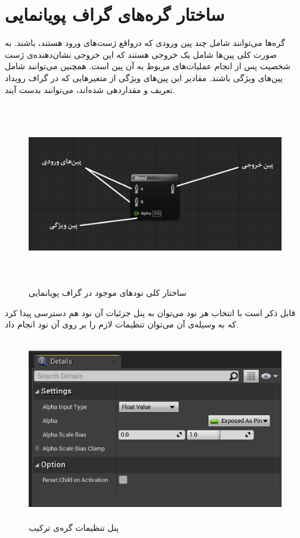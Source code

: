 \section{ساختار گره‌های گراف پویانمایی}

گره‌‌ها می‌توانند شامل چند پین ورودی که درواقع ژست‌های ورود هستند، باشند.
به صورت کلی پین‌ها شامل یک خروجی هستند که این خروجی نشان‌دهنده‌ی 
ژست شخصیت پس از انجام عملیات‌های مربوط به آن پین است.
همچنین می‌توانند شامل پین‌های ویژگی باشند. مقادیر این پین‌های ویژگی از 
متغیر‌هایی که در گراف رویداد تعریف و مقداردهی شده‌اند، می‌توانند بدست آیند.

\begin{figure}[ht]
	\centerline{\includegraphics[width=\textwidth,height=8cm,keepaspectratio]{Figures/Ch3/AnimNodeStructure.png}}

	\caption{ساختار کلی نود‌های موجود در گراف پویانمایی}
	\label{fig:AnimNodeStructure}
\end{figure}

قابل ذکر است با انتخاب هر نود می‌توان به پنل جزئیات آن نود هم دسترسی پیدا کرد 
که به وسیله‌ی آن می‌توان تنظیمات لازم را بر روی آن نود انجام داد.

\begin{figure}[ht]
	\centerline{\includegraphics[width=\textwidth,height=8cm,keepaspectratio]{Figures/Ch3/DetailsPanel.png}}

	\caption{پنل تنظیمات گره‌ی ترکیب}
	\label{fig:AnimNodeDetailPanel}
\end{figure}

